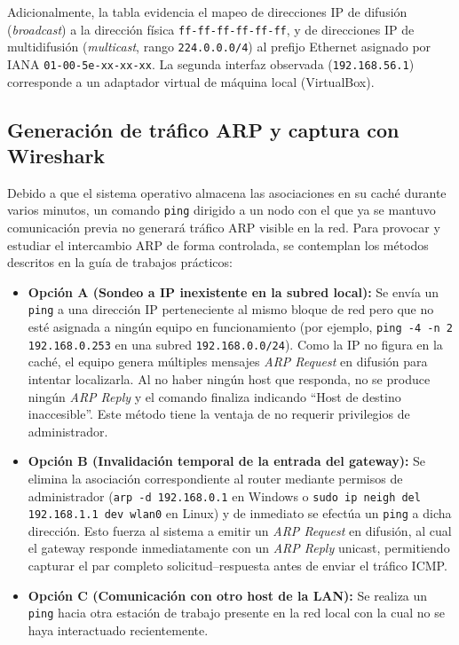 \documentclass[12pt,a4paper]{article}
\begin{document}
Adicionalmente, la tabla evidencia el mapeo de direcciones IP de difusión (\emph{broadcast}) a la dirección física \texttt{ff-ff-ff-ff-ff-ff}, y de direcciones IP de multidifusión (\emph{multicast}, rango \texttt{224.0.0.0/4}) al prefijo Ethernet asignado por IANA \texttt{01-00-5e-xx-xx-xx}. La segunda interfaz observada (\texttt{192.168.56.1}) corresponde a un adaptador virtual de máquina local (VirtualBox).

\subsection{Generación de tráfico ARP y captura con Wireshark}

Debido a que el sistema operativo almacena las asociaciones en su caché durante varios minutos, un comando \texttt{ping} dirigido a un nodo con el que ya se mantuvo comunicación previa no generará tráfico ARP visible en la red. Para provocar y estudiar el intercambio ARP de forma controlada, se contemplan los métodos descritos en la guía de trabajos prácticos:

\begin{itemize}
    \item \textbf{Opción A (Sondeo a IP inexistente en la subred local):} Se envía un \texttt{ping} a una dirección IP perteneciente al mismo bloque de red pero que no esté asignada a ningún equipo en funcionamiento (por ejemplo, \texttt{ping -4 -n 2 192.168.0.253} en una subred \texttt{192.168.0.0/24}). Como la IP no figura en la caché, el equipo genera múltiples mensajes \emph{ARP Request} en difusión para intentar localizarla. Al no haber ningún host que responda, no se produce ningún \emph{ARP Reply} y el comando finaliza indicando ``Host de destino inaccesible''. Este método tiene la ventaja de no requerir privilegios de administrador.
    \item \textbf{Opción B (Invalidación temporal de la entrada del gateway):} Se elimina la asociación correspondiente al router mediante permisos de administrador (\texttt{arp -d 192.168.0.1} en Windows o \texttt{sudo ip neigh del 192.168.1.1 dev wlan0} en Linux) y de inmediato se efectúa un \texttt{ping} a dicha dirección. Esto fuerza al sistema a emitir un \emph{ARP Request} en difusión, al cual el gateway responde inmediatamente con un \emph{ARP Reply} unicast, permitiendo capturar el par completo solicitud--respuesta antes de enviar el tráfico ICMP.
    \item \textbf{Opción C (Comunicación con otro host de la LAN):} Se realiza un \texttt{ping} hacia otra estación de trabajo presente en la red local con la cual no se haya interactuado recientemente.
\end{itemize}
\end{document}
